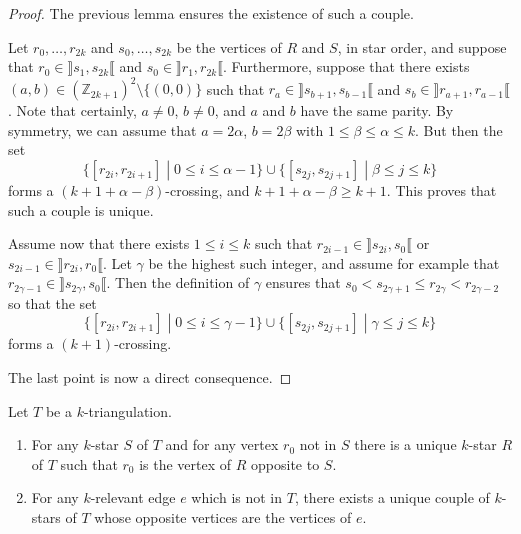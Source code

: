 \documentclass[12pt]{amsart}
\begin{document}
\begin{proof}
The previous lemma ensures the existence of such a couple.

Let $r_0,\ldots,r_{2k}$ and $s_0,\ldots,s_{2k}$ be the vertices of $R$ and $S$, in star order, and suppose that $r_0\in\rrbracket s_1,s_{2k}\llbracket$ and $s_0\in\rrbracket r_1,r_{2k}\llbracket$. Furthermore, suppose that there exists $(a,b)\in(\mathbb{Z}_{2k+1})^2\setminus\{(0,0)\}$ such that $r_a\in\rrbracket s_{b+1},s_{b-1}\llbracket$ and $s_b\in\rrbracket r_{a+1},r_{a-1}\llbracket$. Note that certainly, $a\ne0$, $b\ne0$, and $a$ and $b$ have the same parity. By symmetry, we can assume that $a=2\alpha$, $b=2\beta$ with $1\le\beta\le\alpha\le k$. But then the set
$$\{[r_{2i},r_{2i+1}]\;|\; 0\le i\le \alpha-1\}\cup\{[s_{2j},s_{2j+1}]\;|\; \beta\le j\le k\}$$
forms a $(k+1+\alpha-\beta)$-crossing, and $k+1+\alpha-\beta\ge k+1$. This proves that such a couple is unique.

Assume now that there exists $1\le i\le k$ such that $r_{2i-1}\in\rrbracket s_{2i},s_0\llbracket$ or $s_{2i-1}\in\rrbracket r_{2i},r_0\llbracket$. Let $\gamma$ be the highest such integer, and assume for example that $r_{2\gamma-1}\in\rrbracket s_{2\gamma},s_0\llbracket$. Then the definition of $\gamma$ ensures that
$s_0<s_{2\gamma+1}\le r_{2\gamma}<r_{2\gamma-2}$
so that the set
$$\{[r_{2i},r_{2i+1}]\;|\; 0\le i\le\gamma-1\}\cup\{[s_{2j},s_{2j+1}]\;|\; \gamma\le j\le k\}$$
forms a $(k+1)$-crossing.

The last point is now a direct consequence.
\end{proof}


\begin{lemma}
Let $T$ be a $k$-triangulation.
\begin{enumerate}
\item For any $k$-star $S$ of $T$ and for any vertex $r_0$ not in $S$ there is a unique $k$-star $R$ of $T$ such that $r_0$ is the vertex of $R$ opposite to $S$.
\item For any $k$-relevant edge $e$ which is not in $T$, there exists a unique couple of $k$-stars of $T$ whose opposite vertices are the vertices of $e$.
\end{enumerate}
\end{lemma}
\end{document}
